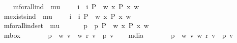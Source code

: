 \begin{isabellebody}
\ \ \isamarkupfalse%
\ mforall{\isacharunderscore}ind\ {\isacharcolon}{\isacharcolon}\ {\isachardoublequoteopen}{\isacharparenleft}mu\ {\isasymRightarrow}\ {\isasymsigma}{\isacharparenright}\ {\isasymRightarrow}\ {\isasymsigma}{\isachardoublequoteclose}\ {\isacharparenleft}{\isachardoublequoteopen}{\isasymforall}i{\isachardoublequoteclose}{\isacharparenright}\ \ {\isachardoublequoteopen}{\isasymforall}i\ P\ {\isasymequiv}\ {\isacharparenleft}{\isasymlambda}w{\isachardot}\ {\isasymforall}x{\isachardot}\ P\ x\ w{\isacharparenright}{\isachardoublequoteclose}\ \ \ \isanewline
\ \ \isamarkupfalse%
\ mexists{\isacharunderscore}ind\ {\isacharcolon}{\isacharcolon}\ {\isachardoublequoteopen}{\isacharparenleft}mu\ {\isasymRightarrow}\ {\isasymsigma}{\isacharparenright}\ {\isasymRightarrow}\ {\isasymsigma}{\isachardoublequoteclose}\ {\isacharparenleft}{\isachardoublequoteopen}{\isasymexists}i{\isachardoublequoteclose}{\isacharparenright}\ \ {\isachardoublequoteopen}{\isasymexists}i\ P\ {\isasymequiv}\ {\isacharparenleft}{\isasymlambda}w{\isachardot}\ {\isasymexists}x{\isachardot}\ P\ x\ w{\isacharparenright}{\isachardoublequoteclose}\isanewline
\ \ \isamarkupfalse%
\ mforall{\isacharunderscore}indset\ {\isacharcolon}{\isacharcolon}\ {\isachardoublequoteopen}{\isacharparenleft}{\isacharparenleft}mu\ {\isasymRightarrow}\ {\isasymsigma}{\isacharparenright}\ {\isasymRightarrow}\ {\isasymsigma}{\isacharparenright}\ {\isasymRightarrow}\ {\isasymsigma}{\isachardoublequoteclose}\ {\isacharparenleft}{\isachardoublequoteopen}{\isasymforall}p{\isachardoublequoteclose}{\isacharparenright}\ \ {\isachardoublequoteopen}{\isasymforall}p\ P\ {\isasymequiv}\ {\isacharparenleft}{\isasymlambda}w{\isachardot}\ {\isasymforall}x{\isachardot}\ P\ x\ w{\isacharparenright}{\isachardoublequoteclose}\isanewline
\ \ \isamarkupfalse%
\ mbox\ {\isacharcolon}{\isacharcolon}\ {\isachardoublequoteopen}{\isasymsigma}\ {\isasymRightarrow}\ {\isasymsigma}{\isachardoublequoteclose}\ {\isacharparenleft}{\isachardoublequoteopen}{\isasymbox}{\isachardoublequoteclose}{\isacharparenright}\ \ {\isachardoublequoteopen}{\isasymbox}\ p\ {\isasymequiv}\ {\isacharparenleft}{\isasymlambda}w{\isachardot}\ {\isasymforall}v{\isachardot}\ {\isasymnot}\ w\ r\ v\ {\isasymor}\ p\ v{\isacharparenright}{\isachardoublequoteclose}\isanewline
\ \ \isamarkupfalse%
\ mdia\ {\isacharcolon}{\isacharcolon}\ {\isachardoublequoteopen}{\isasymsigma}\ {\isasymRightarrow}\ {\isasymsigma}{\isachardoublequoteclose}\ {\isacharparenleft}{\isachardoublequoteopen}{\isasymdiamond}{\isachardoublequoteclose}{\isacharparenright}\ \ {\isachardoublequoteopen}{\isasymdiamond}\ p\ {\isasymequiv}\ {\isacharparenleft}{\isasymlambda}w{\isachardot}\ {\isasymexists}v{\isachardot}\ w\ r\ v\ {\isasymand}\ p\ v{\isacharparenright}{\isachardoublequoteclose}%

\end{isabellebody}

